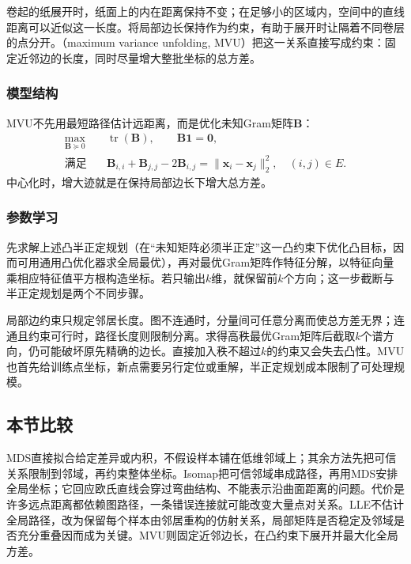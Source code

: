 卷起的纸展开时，纸面上的内在距离保持不变；在足够小的区域内，空间中的直线距离可以近似这一长度。将局部边长保持作为约束，有助于展开时让隔着不同卷层的点分开。（maximum variance unfolding, MVU）把这一关系直接写成约束：固定近邻边的长度，同时尽量增大整批坐标的总方差。

\subsubsection{模型结构}

MVU不先用最短路径估计远距离，而是优化未知Gram矩阵$\bm{B}$：
\[
  \begin{aligned}
    \max_{\bm{B}\succeq0}\quad&
      \operatorname{tr}(\bm{B}),\qquad \bm{B}\bm{1}=\bm{0},\\
    \text{满足}\quad&
      \bm{B}_{i,i}+\bm{B}_{j,j}-2\bm{B}_{i,j}
      =\lVert\bm{x}_i-\bm{x}_j\rVert_2^2,\quad(i,j)\in E.
  \end{aligned}
\]
中心化时，增大迹就是在保持局部边长下增大总方差。

\subsubsection{参数学习}
先求解上述凸半正定规划（在“未知矩阵必须半正定”这一凸约束下优化凸目标，因而可用通用凸优化器求全局最优），再对最优Gram矩阵作特征分解，以特征向量乘相应特征值平方根构造坐标。若只输出$k$维，就保留前$k$个方向；这一步截断与半正定规划是两个不同步骤。

局部边约束只规定邻居长度。图不连通时，分量间可任意分离而使总方差无界；连通且约束可行时，路径长度则限制分离。求得高秩最优Gram矩阵后截取$k$个谱方向，仍可能破坏原先精确的边长。直接加入秩不超过$k$的约束又会失去凸性。MVU也首先给训练点坐标，新点需要另行定位或重解，半正定规划成本限制了可处理规模。

\subsection{本节比较}
\label{sec:dim-manifold-comparison}

MDS直接拟合给定差异或内积，不假设样本铺在低维邻域上；其余方法先把可信关系限制到邻域，再约束整体坐标。Isomap把可信邻域串成路径，再用MDS安排全局坐标；它回应欧氏直线会穿过弯曲结构、不能表示沿曲面距离的问题。代价是许多远点距离都依赖图路径，一条错误连接就可能改变大量点对关系。LLE不估计全局路径，改为保留每个样本由邻居重构的仿射关系，局部矩阵是否稳定及邻域是否充分重叠因而成为关键。MVU则固定近邻边长，在凸约束下展开并最大化全局方差。

